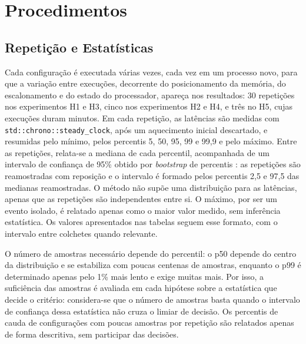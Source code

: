 \documentclass[
    12pt,
    oneside,
    a4paper,
    chapter=TITLE,
    section=TITLE,
    english,
    brazil
]{abntex2}
\begin{document}
\section{Procedimentos}
\label{sec:metricas}

\subsection{Repetição e Estatísticas}
Cada configuração é executada várias vezes, cada vez em um processo novo,
para que a variação entre execuções, decorrente do posicionamento da
memória, do escalonamento e do estado do processador, apareça nos
resultados: 30 repetições nos experimentos H1 e H3, cinco nos experimentos
H2 e H4, e três no H5, cujas execuções duram minutos. Em cada repetição,
as latências são medidas com \texttt{std::chrono::steady\_clock}, após um
aquecimento inicial descartado, e resumidas pelo mínimo, pelos percentis
5, 50, 95, 99 e 99,9 e pelo máximo. Entre as repetições, relata-se a
mediana de cada percentil, acompanhada de um intervalo de confiança de
95\% obtido por \textit{bootstrap} de percentis \cite{efron1993bootstrap}: as repetições são
reamostradas com reposição e o intervalo é formado pelos percentis 2,5 e
97,5 das medianas reamostradas. O método não supõe uma distribuição para
as latências, apenas que as repetições são independentes entre si. O
máximo, por ser um evento isolado, é relatado apenas como o maior valor
medido, sem inferência estatística. Os valores apresentados nas tabelas
seguem esse formato, com o intervalo entre colchetes quando relevante.

O número de amostras necessário depende do percentil: o p50 depende do
centro da distribuição e se estabiliza com poucas centenas de amostras,
enquanto o p99 é determinado apenas pelo 1\% mais lento e exige muitas
mais. Por isso, a suficiência das amostras é avaliada em cada hipótese
sobre a estatística que decide o critério: considera-se que o número de
amostras basta quando o intervalo de confiança dessa estatística não
cruza o limiar de decisão. Os percentis de cauda de configurações com
poucas amostras por repetição são relatados apenas de forma descritiva,
sem participar das decisões.
\end{document}
